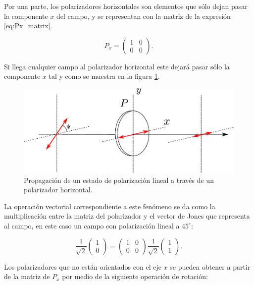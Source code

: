 Por una parte, los polarizadores horizontales son elementos que sólo
dejan pasar la componente $x$ del campo, y se representan con la
matriz de la expresión \ref{eq:Px_matrix}.

\begin{equation}
P_x = \begin{pmatrix}1 &0\\0&0\end{pmatrix}.
\label{eq:Px_matrix}
\end{equation}

Si llega cualquier campo al polarizador horizontal este dejará pasar
sólo la componente $x$ tal y
como se muestra en la figura \ref{fig:linear_polarizer}. 

\begin{figure}[h!]
\centering
\includegraphics[scale = .7]{linear_polarizer}
\caption{Propagación de un estado de polarización lineal a través de
  un polarizador horizontal.}
\label{fig:linear_polarizer}
\end{figure}

La  operación vectorial correspondiente a este fenómeno se da como la
multiplicación entre la matriz del polarizador y el vector de Jones
que representa al campo, en este caso un campo con polarización lineal
a $45^{\circ}$:

\begin{equation*}
\frac{1}{\sqrt{2}}
\begin{pmatrix}
1\\0
\end{pmatrix}
=
\begin{pmatrix}
1 &0\\0&0
\end{pmatrix}
\frac{1}{\sqrt{2}}
\begin{pmatrix}
1 \\1
\end{pmatrix}.
\end{equation*}

Los polarizadores que no están orientados con el eje $x$ se pueden
obtener a partir de la matriz de $P_x$ por medio de la siguiente
operación de rotación: 

